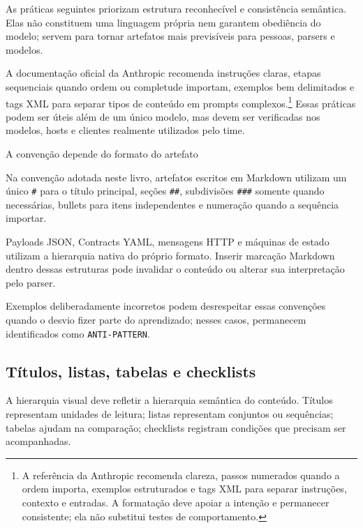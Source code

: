 \documentclass[
  10pt,
  a4paper,
  oneside]{book}
\begin{document}
As práticas seguintes priorizam estrutura reconhecível e consistência
semântica. Elas não constituem uma linguagem própria nem garantem
obediência do modelo; servem para tornar artefatos mais previsíveis para
pessoas, parsers e modelos.

A documentação oficial da Anthropic recomenda instruções claras, etapas
sequenciais quando ordem ou completude importam, exemplos bem
delimitados e tags XML para separar tipos de conteúdo em prompts
complexos.\footnote{A referência da Anthropic recomenda clareza, passos
  numerados quando a ordem importa, exemplos estruturados e tags XML
  para separar instruções, contexto e entradas. A formatação deve apoiar
  a intenção e permanecer consistente; ela não substitui testes de
  comportamento.} Essas práticas podem ser úteis além de um único
modelo, mas devem ser verificadas nos modelos, hosts e clientes
realmente utilizados pelo time.

\begin{infobox}{A convenção depende do formato do artefato}

Na convenção adotada neste livro, artefatos escritos em Markdown
utilizam um único \texttt{\#} para o título principal, seções
\texttt{\#\#}, subdivisões \texttt{\#\#\#} somente quando necessárias,
bullets para itens independentes e numeração quando a sequência
importar.

Payloads JSON, Contracts YAML, mensagens HTTP e máquinas de estado
utilizam a hierarquia nativa do próprio formato. Inserir marcação
Markdown dentro dessas estruturas pode invalidar o conteúdo ou alterar
sua interpretação pelo parser.

Exemplos deliberadamente incorretos podem desrespeitar essas convenções
quando o desvio fizer parte do aprendizado; nesses casos, permanecem
identificados como \texttt{ANTI-PATTERN}.

\end{infobox}

\hypertarget{tuxedtulos-listas-tabelas-e-checklists}{%
\subsection{Títulos, listas, tabelas e
checklists}\label{tuxedtulos-listas-tabelas-e-checklists}}

A hierarquia visual deve refletir a hierarquia semântica do conteúdo.
Títulos representam unidades de leitura; listas representam conjuntos ou
sequências; tabelas ajudam na comparação; checklists registram condições
que precisam ser acompanhadas.
\end{document}
